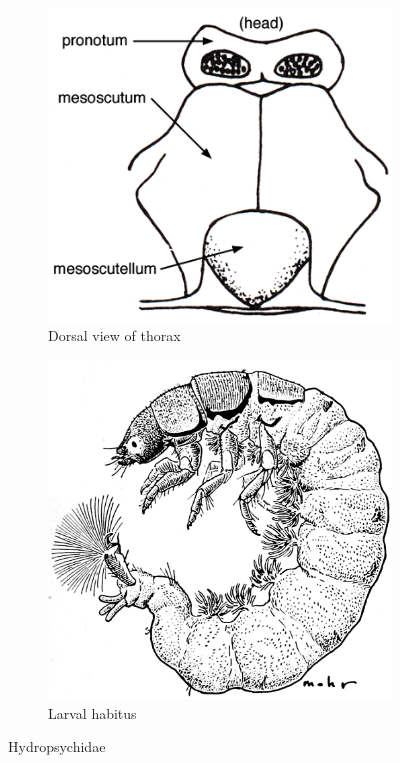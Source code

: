 \documentclass[letterpaper, 11pt]{article}
\begin{document}
\begin{figure}[ht!]
    \centering
    \begin{subfigure}[ht!]{0.36\textwidth}
        \includegraphics[width=\textwidth]{TrichoImage03}
        \caption{Dorsal view of thorax \citep[][Fig. 80]{bhl50956}}
        \label{fig:hydropsychid1}
    \end{subfigure}
    \hfill 
    \begin{subfigure}[ht!]{0.4\textwidth}
        \includegraphics[width=\textwidth]{HydropsychidLarva}%
        \caption{Larval habitus \citep[][Fig. 281]{bhl50956}}
        \label{fig:hydropsychid2}
    \end{subfigure}
    \caption{Hydropsychidae}\label{fig:hydropsychids}
\end{figure}
\end{document}
